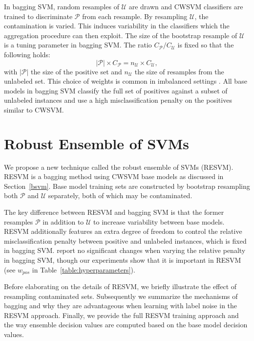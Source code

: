 \documentclass[preprint,elsarticle-num,12pt]{elsarticle}
\newcommand{\posset}{\mathcal{P}}
\newcommand{\unlset}{\mathcal{U}}
\begin{document}
In bagging SVM, random resamples of $\unlset$ are drawn and CWSVM classifiers are trained to discriminate $\posset$ from each resample. By resampling $\unlset$, the contamination is varied. This induces variability in the classifiers which the aggregation procedure can then exploit. The size of the bootstrap resample of $\mathcal{U}$ is a tuning parameter in bagging SVM. The ratio $C_{\mathcal{P}}/C_{\mathcal{U}}$ is fixed so that the following holds:
\begin{equation}
|\mathcal{P}| \times C_{\mathcal{P}} = n_{\mathcal{U}} \times C_{\mathcal{U}}, \label{eq:bagpenalties}
\end{equation}
with $|\mathcal{P}|$ the size of the positive set and $n_{\mathcal{U}}$ the size of resamples from the unlabeled set. This choice of weights is common in imbalanced settings \citep{cawley2006leave,daemen2009kernel}. All base models in bagging SVM classify the full set of positives against a subset of unlabeled instances and use a high misclassification penalty on the positives similar to CWSVM. %




\section{Robust Ensemble of SVMs}

We propose a new technique called the robust ensemble of SVMs (RESVM). RESVM is a bagging method using CWSVM base models as discussed in Section~\ref{bsvm}. Base model training sets are constructed by bootstrap resampling both $\mathcal{P}$ and $\mathcal{U}$ separately, both of which may be contaminated. 

The key difference between RESVM and bagging SVM is that the former resamples $\mathcal{P}$ in addition to $\mathcal{U}$ to increase variability between base models. RESVM additionally features an extra degree of freedom to control the relative misclassification penalty between positive and unlabeled instances, which is fixed in bagging SVM. \citet{mordelet2014bagging} report no significant changes when varying the relative penalty in bagging SVM, though our experiments show that it is important in RESVM (see $w_{pos}$ in Table~\ref{table:hyperparameters}).

Before elaborating on the details of RESVM, we briefly illustrate the effect of resampling contaminated sets. Subsequently we summarize the mechanisms of bagging and why they are advantageous when learning with label noise in the RESVM approach. Finally, we provide the full RESVM training approach and the way ensemble decision values are computed based on the base model decision values.
\end{document}
